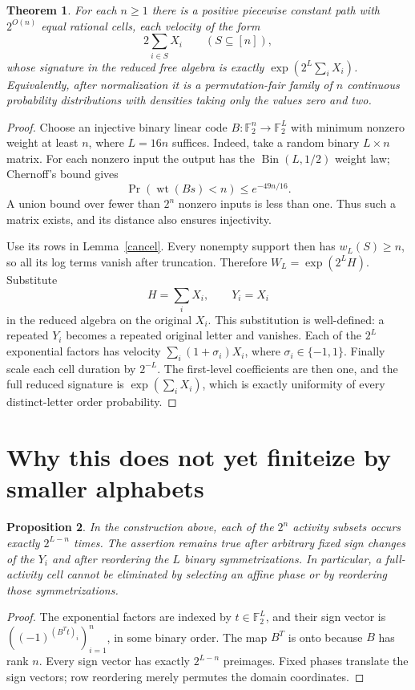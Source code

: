 \documentclass[11pt]{article}
\newtheorem{theorem}{Theorem}
\newtheorem{proposition}[theorem]{Proposition}
\newcommand{\wt}{\operatorname{wt}}
\begin{document}
\begin{theorem}\label{path}
For each $n\ge1$ there is a positive piecewise constant path with
$2^{O(n)}$ equal rational cells, each velocity of the form
\[
 2\sum_{i\in S}X_i\qquad(S\subseteq[n]),
\]
whose signature in the reduced free algebra is exactly
$\exp(2^L\sum_iX_i)$. Equivalently, after normalization it is a
permutation-fair family of $n$ continuous probability distributions with
densities taking only the values zero and two.
\end{theorem}
\begin{proof}
Choose an injective binary linear code $B:\mathbb F_2^n\to
\mathbb F_2^L$ with minimum nonzero weight at least $n$, where $L=16n$
suffices. Indeed, take a random binary $L\times n$ matrix. For each
nonzero input the output has the $\operatorname{Bin}(L,1/2)$ weight law;
Chernoff's bound gives
\[
 \Pr(\wt(Bs)<n)\le e^{-49n/16}.
\]
A union bound over fewer than $2^n$ nonzero inputs is less than one.
Thus such a matrix exists, and its distance also ensures injectivity.

Use its rows in Lemma~\ref{cancel}. Every nonempty support then has
$w_L(S)\ge n$, so all its log terms vanish after truncation. Therefore
$W_L=\exp(2^L H)$. Substitute
\[
 H=\sum_iX_i,\qquad Y_i=X_i
\]
in the reduced algebra on the original $X_i$. This substitution is
well-defined: a repeated $Y_i$ becomes a repeated original letter and
vanishes. Each of the $2^L$ exponential factors has velocity
$\sum_i(1+\sigma_i)X_i$, where $\sigma_i\in\{-1,1\}$.
Finally scale each cell duration by $2^{-L}$. The first-level coefficients
are then one, and the full reduced signature is $\exp(\sum_iX_i)$,
which is exactly uniformity of every distinct-letter order probability.
\end{proof}

\section*{Why this does not yet finiteize by smaller alphabets}
\begin{proposition}\label{full}
In the construction above, each of the $2^n$ activity subsets occurs
exactly $2^{L-n}$ times. The assertion remains true after arbitrary
fixed sign changes of the $Y_i$ and after reordering the $L$ binary
symmetrizations. In particular, a full-activity cell cannot be eliminated
by selecting an affine phase or by reordering those symmetrizations.
\end{proposition}
\begin{proof}
The exponential factors are indexed by $t\in\mathbb F_2^L$, and their
sign vector is $((-1)^{(B^Tt)_i})_{i=1}^n$, in some binary order.
The map $B^T$ is onto because $B$ has rank $n$. Every sign vector has
exactly $2^{L-n}$ preimages. Fixed phases translate the sign vectors;
row reordering merely permutes the domain coordinates.
\end{proof}
\end{document}
